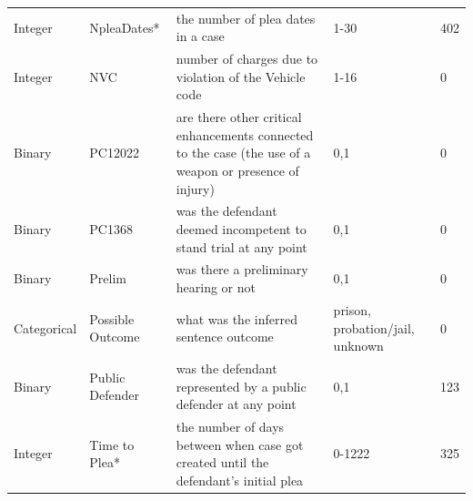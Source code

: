 \documentclass{AISB2008}
\begin{document}
\begin{table}
\begin{tabular}{llp{8cm}p{5cm}l}
Integer     & NpleaDates*          & the number of plea dates in a case                                                                      & 1-30                                                                                                                              & 402            \\
Integer     & NVC                  & number of charges due to violation of the Vehicle code                                                  & 1-16                                                                                                                              & 0              \\
Binary      & PC12022              & are there other critical enhancements connected to the case (the use of a weapon or presence of injury) & 0,1                                                                                                                               & 0              \\
Binary      & PC1368               & was the defendant deemed incompetent to stand trial at any point                                        & 0,1                                                                                                                               & 0              \\
Binary      & Prelim               & was there a preliminary hearing or not                                                                  & 0,1                                                                                                                               & 0              \\
Categorical & Possible Outcome     & what was the inferred sentence outcome                                                                  & prison, probation/jail, unknown                                                                                                   & 0              \\
Binary      & Public Defender      & was the defendant represented by a public defender at any point                                         & 0,1                                                                                                                               & 123            \\
Integer     & Time to Plea*        & the number of days between when case got created until the defendant's initial plea                     & 0-1222                                                                                                                            & 325            \\

\end{tabular}
\end{table}
\end{document}
